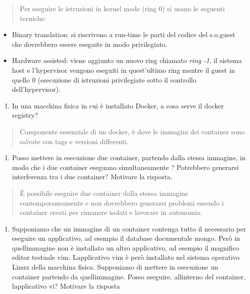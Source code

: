 \begin{quote}
Per eseguire le istruzioni in kernel mode (ring 0) si usano le seguenti
tecniche:
\end{quote}

\begin{itemize}
\item
  Binary translation: si riscrivono a run-time le parti del codice del
  s.o.guest che dovrebbero essere eseguite in modo privilegiato.
\item
  Hardware assisted: viene aggiunto un nuovo ring chiamato \emph{ring
  -1}, il sistema host e l'hypervisor vengono eseguiti in quest'ultimo
  ring mentre il guest in quello 0 (esecuzione di istruzioni
  privilegiate sotto il controllo dell'hypervisor).
\end{itemize}

\begin{enumerate}
\def\labelenumi{\arabic{enumi}.}
\setcounter{enumi}{2}
\item
  In una macchina fisica in cui è installato Docker, a cosa serve il
  docker registry?
\end{enumerate}

\begin{quote}
Componente essenziale di un docker, è dove le immagini dei container
sono salvate con tags e versioni differenti.
\end{quote}

\begin{enumerate}
\def\labelenumi{\arabic{enumi}.}
\setcounter{enumi}{3}
\item
  Posso mettere in esecuzione due container, partendo dalla stessa
  immagine, in modo che i due container eseguano simultaneamente ?
  Potrebbero generarsi interferenza tra i due container? Motivare la
  risposta.
\end{enumerate}

\begin{quote}
È possibile eseguire due container dalla stessa immagine
contemporaneamente e non dovrebbero generarsi problemi essendo i
container creati per rimanere isolati e lavorare in autonomia.
\end{quote}

\begin{enumerate}
\def\labelenumi{\arabic{enumi}.}
\setcounter{enumi}{4}
\item
  Supponiamo che un immagine di un container contenga tutto il
  necessario per eseguire un applicativo, ad esempio il database
  documentale mongo. Però in quell\textquotesingle immagine non è
  installato un altro applicativo, ad esempio il magnifico editor
  testuale vim. L\textquotesingle applicativo vim è però installato nel
  sistema operativo Linux della macchina fisica. Supponiamo di mettere
  in esecuzione un container partendo da quell\textquotesingle immagine.
  Posso eseguire, all\textquotesingle interno del container,
  l\textquotesingle applicativo vi? Motivare la risposta
\end{enumerate}

